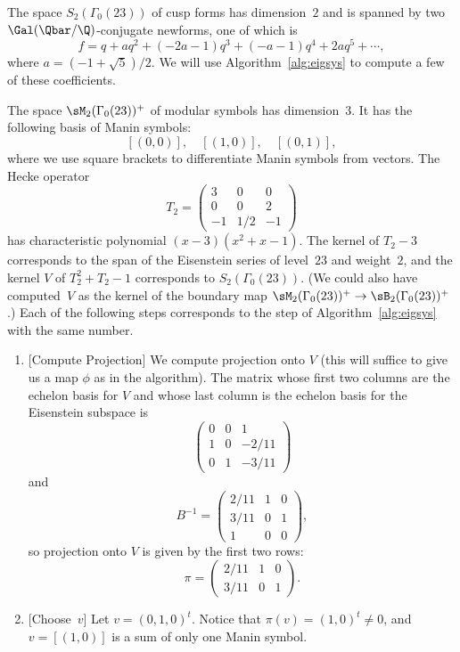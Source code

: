 \begin{example}\label{ex:23}
The space $S_2(\Gamma_0(23))$ of cusp forms has dimension~$2$
and is spanned by two $\Gal(\Qbar/\Q)$-conjugate newforms, 
one of which is
$$
f = q + aq^2 + (-2a - 1)q^3 + (-a - 1)q^4 + 2aq^5 + \cdots,
$$
where $a=(-1+\sqrt{5})/2$.
We will use Algorithm~\ref{alg:eigsys} to compute a few
of these coefficients.

The space $\sM_2(\Gamma_0(23))^+$ of modular symbols has dimension~$3$.
It has the following basis of Manin symbols:
$$
[(0,0)],\quad [(1,0)], \quad [(0,1)],
$$
where we use square brackets to differentiate Manin symbols
from vectors. 
The Hecke operator 
$$
T_2 = \left(\begin{array}{ccc}
3&0&0\\
0&0&2\\
-1&1/2&-1
\end{array}\right)
$$ has characteristic polynomial 
$(x-3)(x^2 + x - 1)$.  The kernel of $T_2-3$ corresponds to the span of
the Eisenstein series of
level~$23$ and weight~$2$, and the kernel $V$ of $T_2^2+T_2-1$
corresponds to $S_2(\Gamma_0(23))$.  (We could also 
have computed~$V$ as the kernel of the boundary map 
$\sM_2(\Gamma_0(23))^+\to \sB_2(\Gamma_0(23))^+$.)
Each of the following steps corresponds to the 
step of Algorithm~\ref{alg:eigsys} with the same number.
\begin{enumerate}
\item{}[Compute Projection] We compute projection onto $V$ (this
will suffice to give us a map $\phi$ as in the algorithm).  The
  matrix whose first two columns are the echelon basis for $V$ and
  whose last column is the echelon basis for the Eisenstein subspace
  is
$$
\left(\begin{array}{ccc}
0&0&1\\
1&0&-2/11\\
0&1&-3/11
\end{array}\right)
$$
and 
$$
 B^{-1} = \left(\begin{array}{ccc}
2/11&1&0\\
3/11&0&1\\
1&0&0
\end{array}\right),
$$
so projection onto $V$ is given by the first two rows:
$$
  \pi = \left(\begin{array}{ccc}
2/11&1&0\\
3/11&0&1
\end{array}\right).
$$


\item{}[Choose~$v$] Let $v=(0,1,0)^t$. Notice that $\pi(v)=(1,0)^t\neq 0$, 
and $v=[(1,0)]$ is a sum of
only one Manin symbol.


\end{enumerate}
\end{example}
